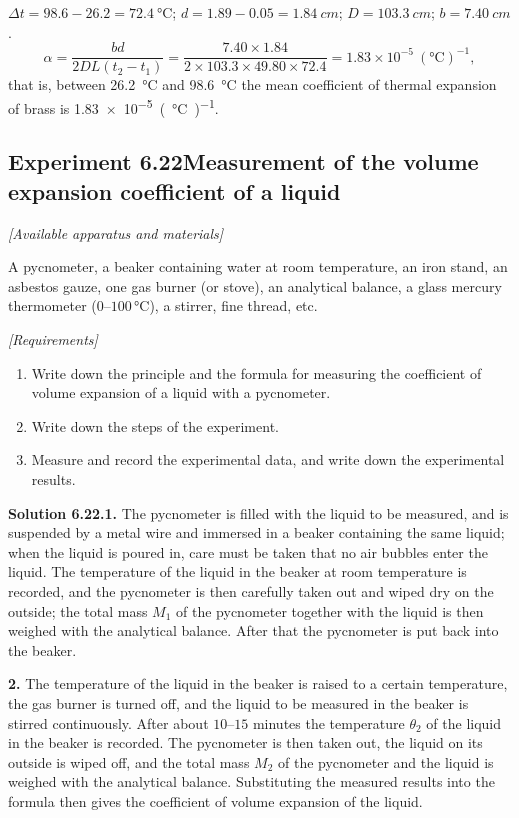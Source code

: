 \noindent$\Delta t=98.6-26.2=\SI{72.4}{\celsius}$; $d=1.89-0.05=\SI{1.84}{cm}$; $D=\SI{103.3}{cm}$; $b=\SI{7.40}{cm}$.
\begin{equation*}
\alpha=\frac{bd}{2DL(t_2-t_1)}
=\frac{7.40\times1.84}{2\times103.3\times49.80\times72.4}
=1.83\times10^{-5}\ (\si{\celsius})^{-1},
\end{equation*}
that is, between \SI{26.2}{\celsius} and \SI{98.6}{\celsius} the mean coefficient of thermal expansion of brass is \SI{1.83e-5}{(\celsius)^{-1}}.

\subsection*{Experiment 6.22\quad Measurement of the volume expansion coefficient of a liquid}

\noindent\textit{[Available apparatus and materials]}

A pycnometer, a beaker containing water at room temperature, an iron stand, an asbestos gauze, one gas burner (or stove), an analytical balance, a glass mercury thermometer ($0$--$100$\,\si{\celsius}), a stirrer, fine thread, etc.

\noindent\textit{[Requirements]}
\begin{enumerate}[label=(\arabic*),leftmargin=2.2em,itemsep=1pt,topsep=2pt]
\item Write down the principle and the formula for measuring the coefficient of volume expansion of a liquid with a pycnometer.
\item Write down the steps of the experiment.
\item Measure and record the experimental data, and write down the experimental results.
\end{enumerate}

\medskip
\noindent\textbf{Solution 6.22.}\quad \textbf{1.} The pycnometer is filled with the liquid to be measured, and is suspended by a metal wire and immersed in a beaker containing the same liquid; when the liquid is poured in, care must be taken that no air bubbles enter the liquid. The temperature of the liquid in the beaker at room temperature is recorded, and the pycnometer is then carefully taken out and wiped dry on the outside; the total mass $M_1$ of the pycnometer together with the liquid is then weighed with the analytical balance. After that the pycnometer is put back into the beaker.

\textbf{2.} The temperature of the liquid in the beaker is raised to a certain temperature, the gas burner is turned off, and the liquid to be measured in the beaker is stirred continuously. After about $10$--$15$ minutes the temperature $\theta_2$ of the liquid in the beaker is recorded. The pycnometer is then taken out, the liquid on its outside is wiped off, and the total mass $M_2$ of the pycnometer and the liquid is weighed with the analytical balance. Substituting the measured results into the formula then gives the coefficient of volume expansion of the liquid.

